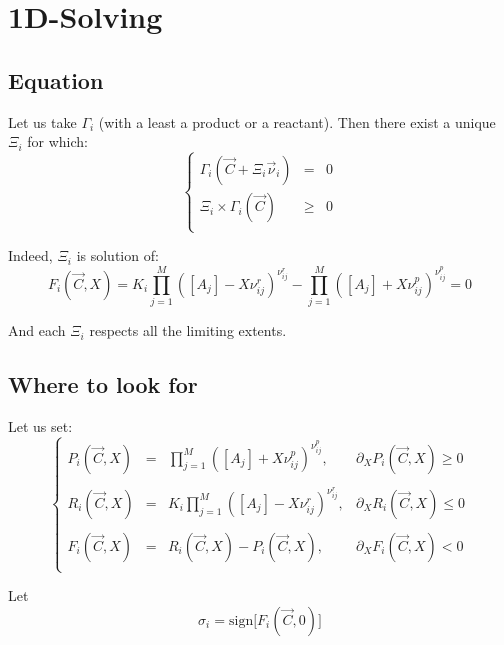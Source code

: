 \documentclass[aps,12pt]{revtex4}
\begin{document}
\section{1D-Solving}

\subsection{Equation}
Let us take $\Gamma_i$ (with a least a product or a reactant).
Then there exist a unique $\Xi_i$ for which:
\begin{equation}
\left\lbrace
\begin{array}{rcl}
	\Gamma_i(\vec{C} + \Xi_i \vec{\nu}_i ) & = & 0\\
	 \Xi_i \times \Gamma_i(\vec{C}) &\geq  &0\\
\end{array}
\right.
\end{equation}
 
Indeed, $\Xi_i$ is solution of:
\begin{equation}
	 F_i(\vec{C},X) =  K_i \prod_{j=1}^{M} \left([A_j] - X \nu^r_{ij}\right)^{\nu^r_{ij}} 
	- \prod_{j=1}^{M} \left([A_j] + X \nu^p_{ij} \right)^{\nu^p_{ij}} = 0
\end{equation} 

And each $\Xi_i$ respects all the limiting extents.

\subsection{Where to look for}
Let us set:
\begin{equation}
\left\lbrace
\begin{array}{rcll}
	P_i(\vec{C},X) & = & \displaystyle \prod_{j=1}^{M} \left([A_j] + X \nu^p_{ij} \right)^{\nu^p_{ij}}, & \partial_X P_i(\vec{C},X) \geq 0 \\
	\\
	R_i(\vec{C},X) & = & \displaystyle K_i \prod_{j=1}^{M} \left([A_j] - X \nu^r_{ij}\right)^{\nu^r_{ij}}, & \partial_X R_i(\vec{C},X) \leq 0 \\
	\\
	 F_i(\vec{C},X) & = & R_i(\vec{C},X)  - P_i(\vec{C},X), & \partial_X F_i(\vec{C},X) < 0\\
\end{array}
\right.
\end{equation}

Let
\begin{equation}
	\sigma_i = \mathrm{sign}\lbrack F_i(\vec{C},0) \rbrack
\end{equation}
\end{document}
